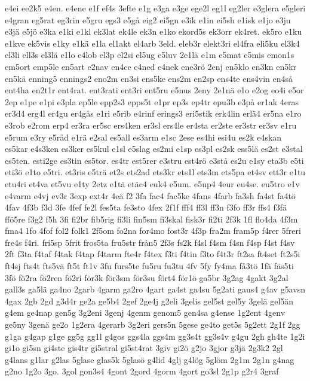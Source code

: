 {e4ei
ee2k5
e4en.
e4ene
e1f
ef4s
3efte
e1g
e3ga
e3ge
ege2l
eg1l
eg2ler
e3glera
e5gleri
e4gran
eg5rat
eg3rin
e5gru
egs3
e5gå
eig2
ei5gn
e3ik
e1in
ei5sh
e1isk
e1jo
e3ju
e3jä
e5jö
e3ka
e1ki
e1kl
ek3lat
ek4le
ek3n
e1ko
ekord5s
ek3orr
ek4ret.
ek5ro
e1ku
e1kve
ek5vis
e1ky
e1kä
e1la
el1akt
el4arb
3eld.
eleb3r
elekt3ri
el4fra
eli5ku
el3k4
el3li
ell3s
el3lä
e1lo
e4lob
el3p
el2si
el5ug
e5luv
2e1lä
e1m
e5mat
e5mis
emon1s
em5ort
emp5le
en5art
e2nav
en4ce
e4ned
e4nek
ene3rö
2enj
en5klo
en3kn
en5kr
en5kä
enning5
ennings2
eno2m
en3si
ens5ke
ens2m
en2sp
ens4te
ens4vin
en4så
ent4ha
en2t1r
ent4rat.
ent3rati
ent3ri
ent5ru
e5nus
2eny
2e1nä
e1o
e2og
eo4i
e5or
2ep
e1pe
e1pi
e3pla
ep5le
epp2s3
epps5t
e1pr
ep3s
ep4tr
epu3b
e3på
er1ak
4eras
er3d4
erg4l
er4gu
er4gås
e1ri
e5rib
e4rinf
erings3
eri5stik
erk4lin
erlä4
er5na
e1ro
e3rob
e2rom
erp4
er3ra
er5sc
ers4ken
er3sl
ers4le
er4sta
er2ste
er3str
er3sv
e1ru
e5rum
e3ry
e5råd
e1rä
e2sal
es5all
es3arm
e1sc
2ese
es4hi
esi4u
es2k
e4skan
es5kar
e4s3ken
es3ker
es5kul
e1sl
e5slag
es2mi
e1sp
es3pl
es2sk
ess5lä
es2st
e3stal
es5ten.
esti2ge
es3tin
es5tor.
es4tr
est5rer
e3stru
est4rö
e3stå
es2u
e1sy
eta3b
e5ti
eti3ö
e1to
e5tri.
et3ris
e5trä
et2s
ets2ad
ets3kr
ets1l
ets3m
ets5pa
et4sv
ett3r
e1tu
etu4ri
et4va
et5vu
e1ty
2etz
e1tä
etäc4
euk4
e5um.
e5up4
4eur
eu4se.
eu5tro
e1v
e4varm
e4vj
ev3r
3exp
ext4r
4eä
f2
3fa
fac4
fac5ke
4fans
4farb
fa3sh
fa4st
fa4tö
4fav
4f3b
f3d
3fe
4fef
fe2l
fes5ta
fe3sto
4fex
2f1f
fff4
ff3l
ff3n
f3fo
ff3r
ffs4
f3fä
ffö5re
f3g2
f5h
3fi
fi2br
fib5rig
fi3li
fin5sm
fi3skal
fisk3r
fi2ti
2f3k
1fl
flo4da
4f3m
fma4
1fo
4fof
fol2
folk1
2f5om
fo2na
for4mo
fost3r
4f3p
fra2m
fram5p
f4rer
5freri
fre4s
f4ri.
fri5sp
5frit
fros5ta
fru5str
från5
2f3s
fs2k
f4sl
f4sm
f4sn
f4sp
f4st
f4sv
2ft
f3ta
f4taf
f4tak
f4tap
f4tarm
fte4r
f4tex
f3ti
f4tin
f3to
f4t3r
ft2sa
ft4set
ft2s5i
ft4sj
fts4t
fts5vä
ft5t
ft1v
3fu
furs5te
fu5ru
fu3tu
4fv
5fy
fy4ma
få3tö
1fä
fäs5ti
3fö
fö2ra
fö2ren
fö2ri
för3k
för3sm
för3su
fört4
för1ö
ga5br
3g2ag
4gakt
3g2al
gall3s
ga5lä
ga4no
2garb
4garm
ga2ro
4gart
ga4st
ga4su
5g2ati
gaus4
g4av
g5avsn
4gax
2gb
2gd
g3d4r
ge2a
ge5b4
2gef
2ge4j
g2eli
3gelis
gel5st
gel5y
3gelä
gel5än
g4em
ge4nap
gen5g
3g2eni
3genj
4genm
genom5
gen4sa
g4ense
1g2ent
4genv
ge5ny
3genä
ge2o
1g2era
4gerarb
3g2eri
gers5n
5gese
ge4to
get5s
5g2ett
2g1f
2gg
g1ga
g4gap
g1ge
gg5g
gg1l
g4gos
ggs4la
ggs4m
gg3s4t
gg3s4v
g4gu
2gh
gh4te
1g2i
gi1o
gi5sn
gi4ste
gis4tr
gi5stral
gi5st4rat
3giv
gi2ö
g2jo
3gjor
g3jä
2g3k2
2gl
g4lans
g1lar
g2las
5glase
glas5k
5glasö
g4lid
4glj
g4lög
5glöm
2g1m
2g1n
g4nag
g2no
1g2o
3go.
3gol
gon3s4
4gont
2gord
4gorm
4gort
go3sl
2g1p
g2r4
3graf
}
